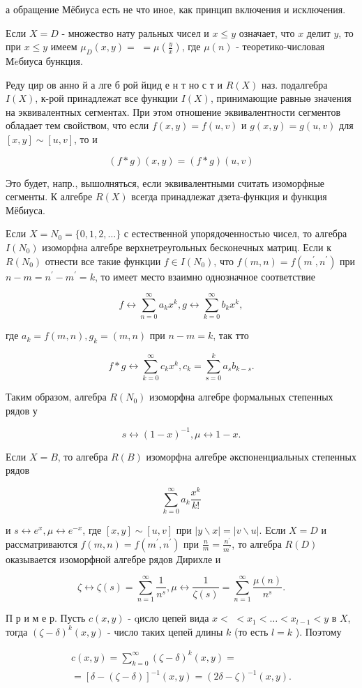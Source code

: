 \documentclass[10pt]{article}
\begin{document}
а обращение Мёбиуса есть не что иное, как принцип включения и исключения.

Если $X=D$ - множество нату ральных чисел и $x \leqslant y$ означает, что $x$ делит $y$, то при $x \leqslant y$ имеем $\mu_{D}(x, y)=$ $=\mu\left(\frac{y}{x}\right)$, где $\mu(n)$ - теоретико-числовая $М \ddot{e} б и у с а$ бункция.

Реду цир ов анно й а лге б рой йцид е н т но с т и $R(X)$ наз. подалгебра $I(X)$, к-рой принадлежат все функции $I(X)$, принимающие равныө значения на эквивалентных сегментах. При этом отношение эквивалентности сегментов обладает тем свойством, что если $f(x, y)=f(u, v)$ и $g(x, y)=g(u, v)$ для $[x, y] \sim[u, v]$, то и

\[
(f * g)(x, y)=(f * g)(u, v)
\]

Это будет, напр., вышолняться, если эквивалентными считать изоморфные сегменты. $К$ алгебре $R(X)$ всегда принадлежат дзета-функция и функция Мёбиуса.

Если $X=N_{0}=\{0,1,2, \ldots\}$ с естественной упорядоченностью чисел, то алгебра $I\left(N_{0}\right)$ изоморфна алгебре верхнетреугольных бесконечных матриц. Если к $R\left(N_{0}\right)$ отнести все такие функции $f \in I\left(N_{0}\right)$, что $f(m, n)=f\left(m^{\prime}, n^{\prime}\right)$ при $n-m=n^{\prime}-m^{\prime}=k$, то имеет место взаимно однозначное соответствие

\[
f \leftrightarrow \sum_{n=0}^{\infty} a_{k} x^{k}, g \leftrightarrow \sum_{k=0}^{\infty} b_{k} x^{k},
\]

где $a_{k}=f(m, n), g_{k}=(m, n)$ при $n-m=k$, так тто

\[
f * g \leftrightarrow \sum_{k=0}^{\infty} c_{k} x^{k}, c_{k}=\sum_{\mathrm{s}=0}^{k} a_{s} b_{k-s} .
\]

Таким образом, алгебра $R\left(N_{0}\right)$ изоморфна алгебре формальных степенных рядов у

\[
s \leftrightarrow(1-x)^{-1}, \mu \leftrightarrow 1-x .
\]

Если $X=B$, то алгебра $R(B)$ изоморфна алгебре әкспоненциальных степенных рядов

\[
\sum_{k=0}^{\infty} a_{k} \frac{x^{k}}{k !}
\]

и $s \leftrightarrow e^{x}, \mu \leftrightarrow e^{-x}$, где $[x, y] \sim[u, v]$ при $|y \backslash x|=|v \backslash u|$. Если $X=D$ и рассматриваются $f(m, n)=f\left(m^{\prime}, n^{\prime}\right)$ при $\frac{n}{m}=\frac{n^{\prime}}{m^{\prime}}$, то алгебра $R(D)$ оказывается изоморфной алгебре рядов Дирихле и

\[
\zeta \leftrightarrow \zeta(s)=\sum_{n=1}^{\infty} \frac{1}{n^{s}}, \mu \leftrightarrow \frac{1}{\zeta(s)}=\sum_{n=1}^{\infty} \frac{\mu(n)}{n^{s}} .
\]

П р и м е р. Пусть $c(x, y)$ - qисло цепей вида $x<$ $<x_{1}<\ldots<x_{l-1}<y$ в $X$, тогда $(\zeta-\delta)^{k}(x, y)$ - число таких цепей длины $k$ (то есть $l=k$ ). Поэтому

\[
\begin{gathered}
c(x, y)=\sum_{k=0}^{\infty}(\zeta-\delta)^{k}(x, y)= \\
=[\delta-(\zeta-\delta)]^{-1}(x, y)=(2 \delta-\zeta)^{-1}(x, y) .
\end{gathered}
\]
\end{document}
